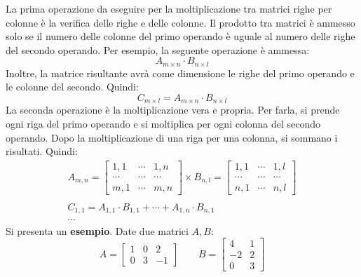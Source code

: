 \documentclass[a4paper]{article}
\begin{document}
	La \textcolor{Red3}{prima operazione} da eseguire per la moltiplicazione tra matrici righe per colonne è la verifica delle righe e delle colonne. Il prodotto tra matrici è ammesso solo se il numero delle colonne del primo operando è uguale al numero delle righe del secondo operando. Per esempio, la seguente operazione è ammessa:
	\begin{equation*}
		A_{m \times n} \cdot B_{n \times l}
	\end{equation*}
	Inoltre, la matrice risultante avrà come dimensione le righe del primo operando e le colonne del secondo. Quindi:
	\begin{equation*}
		C_{m \times l} = A_{m \times n} \cdot B_{n \times l}
	\end{equation*}
	La \textcolor{Red3}{seconda operazione} è la moltiplicazione vera e propria. Per farla, si prende ogni riga del primo operando e si moltiplica per ogni colonna del secondo operando. Dopo la moltiplicazione di una riga per una colonna, si sommano i risultati. Quindi:
	\begin{gather*}
		A_{m,n} = \begin{bmatrix}
			1,1 	& \cdots & 1,n 		\\
			\cdots 	& \cdots & \cdots	\\
			m,1		& \cdots & m,n
		\end{bmatrix} \times
		B_{n,l} = \begin{bmatrix}
			1,1 	& \cdots & 1,l 		\\
			\cdots 	& \cdots & \cdots	\\
			n,1		& \cdots & n,l
		\end{bmatrix} \\
		\\
		C_{1,1} = A_{1,1} \cdot B_{1,1} + \cdots + A_{1,n} \cdot B_{n,1} \\
		\cdots
	\end{gather*}
	Si presenta un \textcolor{Green4}{\textbf{esempio}}. Date due matrici $A,B$:
	\begin{equation*}
		A = \begin{bmatrix}
			1 & 0 &  2 \\
			0 & 3 & -1
		\end{bmatrix} \hspace{2em}
		B = \begin{bmatrix}
			4  	& 1 \\
			-2 	& 2 \\
			0 	& 3
		\end{bmatrix}
	\end{equation*}
\end{document}
